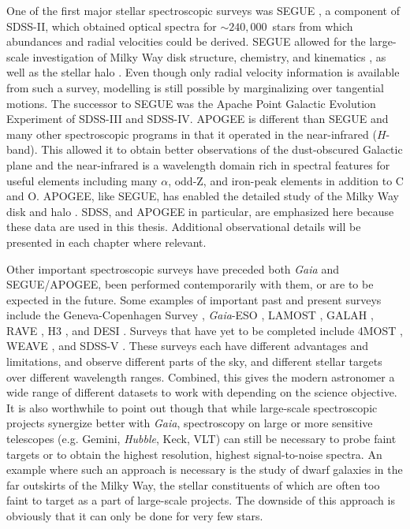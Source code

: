 One of the first major stellar spectroscopic surveys was SEGUE \parencite{segue}, a component of SDSS-II, which obtained optical spectra for $\sim 240,000$~stars from which abundances and radial velocities could be derived. SEGUE allowed for the large-scale investigation of Milky Way disk structure, chemistry, and kinematics \parencite[e.g.][]{bovy12c,bovy12d,schonrich12,bovy13}, as well as the stellar halo \parencite[e.g.][]{smith09,xue11,kafle12,xue15}. Even though only radial velocity information is available from such a survey, modelling is still possible by marginalizing over tangential motions. The successor to SEGUE was the Apache Point Galactic Evolution Experiment \parencite[APOGEE;][]{apogee} of SDSS-III and SDSS-IV. APOGEE is different than SEGUE and many other spectroscopic programs in that it operated in the near-infrared ($H$-band). This allowed it to obtain better observations of the dust-obscured Galactic plane and the near-infrared is a wavelength domain rich in spectral features for useful elements including many $\alpha$, odd-Z, and iron-peak elements in addition to C and O. APOGEE, like SEGUE, has enabled the detailed study of the Milky Way disk and halo \parencite[see][for a few examples of noteworthy results]{bovy12a,hayden15,hayes18,mackereth19a}. SDSS, and APOGEE in particular, are emphasized here because these data are used in this thesis. Additional observational details will be presented in each chapter where relevant.

Other important spectroscopic surveys have preceded both \textit{Gaia} and SEGUE/APOGEE, been performed contemporarily with them, or are to be expected in the future. Some examples of important past and present surveys include the Geneva-Copenhagen Survey \parencite{gcs}, \textit{Gaia}-ESO \parencite{gaiaeso}, LAMOST \parencite{lamost}, GALAH \parencite{galah}, RAVE \parencite{ravedr16}, H3 \parencite{h3}, and DESI \parencite{desi}. Surveys that have yet to be completed include 4MOST \parencite{4most}, WEAVE \parencite{weave}, and SDSS-V \parencite{sdss5}. These surveys each have different advantages and limitations, and observe different parts of the sky, and different stellar targets over different wavelength ranges. Combined, this gives the modern astronomer a wide range of different datasets to work with depending on the science objective. It is also worthwhile to point out though that while large-scale spectroscopic projects synergize better with \textit{Gaia}, spectroscopy on large or more sensitive telescopes (e.g. Gemini, \textit{Hubble}, Keck, VLT) can still be necessary to probe faint targets or to obtain the highest resolution, highest signal-to-noise spectra. An example where such an approach is necessary is the study of dwarf galaxies in the far outskirts of the Milky Way, the stellar constituents of which are often too faint to target as a part of large-scale projects. The downside of this approach is obviously that it can only be done for very few stars.

